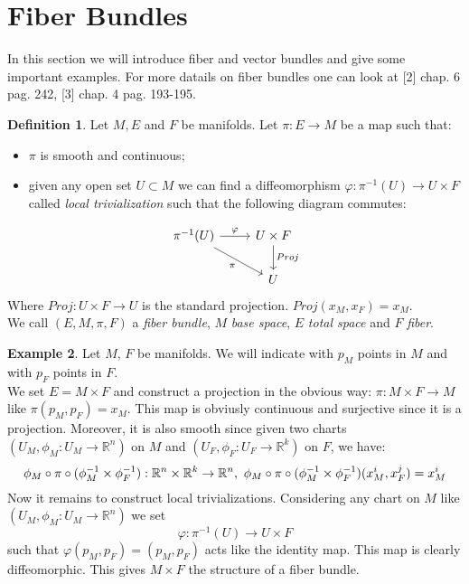 \documentclass[12pt,a4paper]{report}
\theoremstyle{definition}
\newtheorem{Def}{Definition}[chapter]
\theoremstyle{Theorem}
\theoremstyle{definition}
\newtheorem{Ex}[Def]{Example}
\theoremstyle{definition}
\begin{document}
		\section{Fiber Bundles}
		In this section we will introduce fiber and vector bundles and give some important examples. For more datails on fiber bundles one can look at [2] chap. 6 pag. 242, [3] chap. 4 pag. 193-195.
			\begin{Def}
				Let $M, E$ and $F$ be manifolds. Let $\pi: E\rightarrow M$ be a map such that:
				\begin{itemize}
					\item $\pi$ is smooth and continuous;
					\item given any open set $U\subset M$ we can find a diffeomorphism $\varphi: \pi^{-1}(U)\rightarrow U\times F$ called \textit{local trivialization} such that the following diagram commutes:
				\end{itemize}
						\[
				\begin{tikzcd}
					\pi^{-1}(U) \arrow{r}{\varphi} \arrow[swap]{dr}{\pi} & U\times F \arrow{d}{Proj}\\
					& U 
				\end{tikzcd}
				\]
				Where $Proj: U\times F\rightarrow U$ is the standard projection. $Proj(x_M,x_F)=x_M$.\\
				We call $(E,M,\pi,F)$ a \textit{fiber bundle}, $M$ \textit{base space}, $E$ \textit{total space} and $F$ \textit{fiber}.
			\end{Def}
			\begin{Ex}\label{Ex_1.1}
				Let $M$, $F$ be manifolds. We will indicate with $p_M$ points in $M$ and with $p_F$ points in $F$.\\ 
				We set $E=M\times F$ and construct a projection in the obvious way: 
				$\pi:M\times F\rightarrow M$ like $\pi(p_M,p_F)=x_M$. This map is obviusly continuous and surjective since it is a projection. Moreover, it is also smooth since given two charts $(U_M,\phi_M:U_M\rightarrow \mathbb{R}^n)$ on $M$ and $(U_F,\phi_F:U_F\rightarrow \mathbb{R}^k)$ on $F$, we have:
				$$\phi_M\circ \pi\circ (\phi_M^{-1}\times \phi_F^{-1}):\mathbb{R}^n\times\mathbb{R}^k\rightarrow\mathbb{R}^n,\hbox{ }\phi_M\circ \pi\circ (\phi_M^{-1}\times \phi_F^{-1})(x^i_M,x^j_F)=x^i_M$$
				Now it remains to construct local trivializations. Considering any chart on $M$ like $(U_M,\phi_M:U_M\rightarrow \mathbb{R}^n)$ we set
				$$\varphi:\pi^{-1}(U)\rightarrow U\times F$$
				such that $\varphi(p_M,p_F)=(p_M,p_F)$ acts like the identity map. This map is clearly diffeomorphic.
				This gives $M\times F$ the structure of a fiber bundle.
			\end{Ex}
\end{document}
